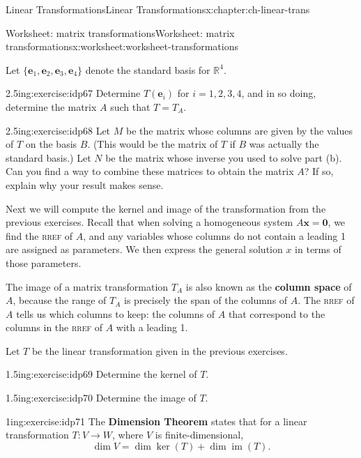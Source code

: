 \documentclass[oneside,10pt,]{book}
\newcommand{\initialism}[1]{\textsc{\MakeLowercase{#1}}}
\newcommand{\terminology}[1]{\textbf{#1}}
\numberwithin{equation}{section}
\newcommand{\R}{\mathbb{R}}
\newcommand{\im}{\operatorname{im}}
\newcommand{\xx}{\mathbf{x}}
\newcommand{\zer}{\mathbf{0}}
\newcommand{\vece}{\mathbf{e}}
\begin{document}
\begin{chapterptx}{Linear Transformations}{}{Linear Transformations}{}{}{x:chapter:ch-linear-trans}
\begin{worksheet-section}{Worksheet: matrix transformations}{}{Worksheet: matrix transformations}{}{}{x:worksheet:worksheet-transformations}
\begin{equation*}
\end{equation*}
%
\par
Let \(\{\vece_1,\vece_2,\vece_3, \vece_4\}\) denote the standard basis for \(\R^4\).%
\begin{divisionexercise}{3}{}{2.5in}{g:exercise:idp67}%
Determine \(T(\vece_i)\) for \(i=1,2,3,4\), and in so doing, determine the matrix \(A\) such that \(T=T_A\).%
\end{divisionexercise}%
\begin{divisionexercise}{4}{}{2.5in}{g:exercise:idp68}%
Let \(M\) be the matrix whose columns are given by the values of \(T\) on the basis \(B\). (This would be the matrix of \(T\) if \(B\) was actually the standard basis.) Let \(N\) be the matrix whose inverse you used to solve part (b). Can you find a way to combine these matrices to obtain the matrix \(A\)? If so, explain why your result makes sense.%
\end{divisionexercise}%
\clearpage
Next we will compute the kernel and image of the transformation from the previous exercises. Recall that when solving a homogeneous system \(A\xx = \zer\), we find the \initialism{RREF} of \(A\), and any variables whose columns do not contain a leading 1 are assigned as parameters. We then express the general solution \(x\) in terms of those parameters.%
\par
The image of a matrix transformation \(T_A\) is also known as the \terminology{column space} of \(A\), because the range of \(T_A\) is precisely the span of the columns of \(A\). The \initialism{RREF} of \(A\) tells us which columns to keep: the columns of \(A\) that correspond to the columns in the \initialism{RREF} of \(A\) with a leading 1.%
\par
Let \(T\) be the linear transformation given in the previous exercises.%
\begin{divisionexercise}{5}{}{1.5in}{g:exercise:idp69}%
Determine the kernel of \(T\).%
\end{divisionexercise}%
\begin{divisionexercise}{6}{}{1.5in}{g:exercise:idp70}%
Determine the image of \(T\).%
\end{divisionexercise}%
\begin{divisionexercise}{7}{}{1in}{g:exercise:idp71}%
The \terminology{Dimension Theorem} states that for a linear transformation \(T:V\to W\), where \(V\) is finite-dimensional,%
\begin{equation*}
\dim V = \dim\ker(T)+ \dim\im(T)\text{.}
\end{equation*}

\end{divisionexercise}
\end{worksheet-section}
\end{chapterptx}
\end{document}
